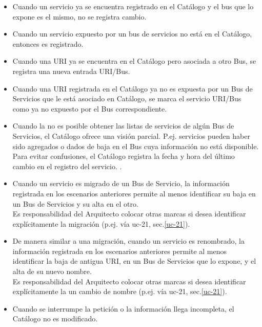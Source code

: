 \begin{itemize}
    \item
        Cuando un servicio ya se encuentra registrado en el Cat\'alogo y 
        el bus que lo expone es el mismo, no se registra cambio.
    \item 
        Cuando un servicio expuesto por un bus de servicios no est\'a en el Cat\'alogo,
        entonces es registrado.
    \item 
        Cuando una URI ya se encuentra en el Cat\'alogo pero asociada a otro Bus,
        se registra una nueva entrada URI/Bus.
    \item 
        Cuando una URI registrada en el Cat\'alogo
        ya no es expuesta por un Bus de Servicios
        que le est\'a asociado en Cat\'alogo,
        se marca el servicio URI/Bus como ya no expuesto por el Bus correspondiente.
    \item 
        Cuando la no es posible obtener las listas de servicios de alg\'un Bus de Servicios,
        el Cat\'alogo ofrece una visi\'on parcial. P.ej. servicios pueden haber sido agregados
        o dados de baja en el Bus cuya informaci\'on no est\'a disponible.\\
        Para evitar confusiones, el Cat\'alogo registra la fecha y hora
        del \'ultimo cambio en el registro del servicio.
        .
    \item 
        Cuando un servicio es migrado de un Bus de Servicio,
        la informaci\'on registrada en los escenarios anteriores permite al menos identificar
        su baja en un Bus de Servicios y su alta en el otro.\\
        Es responsabilidad del Arquitecto colocar otras marcas si desea identificar
        expl\'icitamente la migraci\'on (p.ej. v\'ia uc-21, sec.\ref{uc-21}).
    \item 
        De manera similar a una migraci\'on, 
        cuando un servicio es renombrado, 
        la informaci\'on registrada en los escenarios anteriores permite al menos identificar
        la baja de antigua URI, en un Bus de Servicios que lo expone, 
        y el alta de su nuevo nombre.\\
        Es responsabilidad del Arquitecto colocar otras marcas si desea identificar
        expl\'icitamente la un cambio de nombre (p.ej. v\'ia uc-21, sec.\ref{uc-21}).
    \item 
        Cuando se interrumpe la petici\'on o la informaci\'on llega incompleta,
        el Cat\'alogo no es modificado.\\
\end{itemize}


